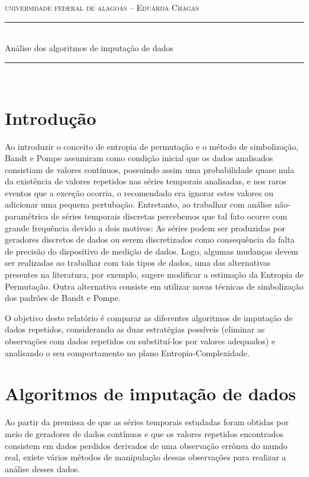 \documentclass[paper=a4, fontsize=11pt]{scrartcl}
\numberwithin{equation}{section}
\numberwithin{figure}{section}
\numberwithin{table}{section}
\newcommand{\horrule}[1]{\rule{\linewidth}{#1}}
\begin{document}
\normalfont \normalsize 
\hspace{2.3cm} \textsc{universidade federal de alagoas -- Eduarda Chagas}\\[25pt]
\horrule{0.5pt} \\[0.5cm]
\huge Análise dos algoritmos de imputação de dados \\ 
\horrule{2pt} \\[0.5cm]
\normalfont \normalsize 

\section{Introdução}

Ao introduzir o conceito de entropia de permutação e o método de simbolização, Bandt e Pompe assumiram como condição inicial que os dados analisados consistiam de valores contínuos, possuindo assim uma probabilidade quase nula da existência de valores repetidos nas séries temporais analisadas, e nos raros eventos que a exceção ocorria, o recomendado era ignorar estes valores ou adicionar uma pequena pertubação. Entretanto, ao trabalhar com análise não-paramétrica de séries temporais discretas percebemos que tal fato ocorre com grande frequência devido a dois motivos: As séries podem ser produzidas por geradores discretos de dados ou serem discretizados como consequência da falta de precisão do dispositivo de medição de dados. Logo, algumas mudanças devem ser realizadas ao trabalhar com tais tipos de dados, uma das alternativas presentes na literatura, por exemplo, sugere modificar a estimação da Entropia de Permutação. Outra alternativa consiste em utilizar novas técnicas de simbolização dos padrões de Bandt e Pompe. 

O objetivo deste relatório é comparar as diferentes algoritmos de imputação de dados repetidos, considerando as duas estratégias possíveis (eliminar as observações com dados repetidos ou substituí-los por valores adequados) e analisando o seu comportamento no plano Entropia-Complexidade.

\section{Algoritmos de imputação de dados}

Ao partir da premissa de que as séries temporais estudadas foram obtidas por meio de geradores de dados contínuos e que os valores repetidos encontrados consistem em dados perdidos derivados de uma observação errônea do mundo real, existe vários métodos de manipulação dessas observações para realizar a análise desses dados.
\end{document}
